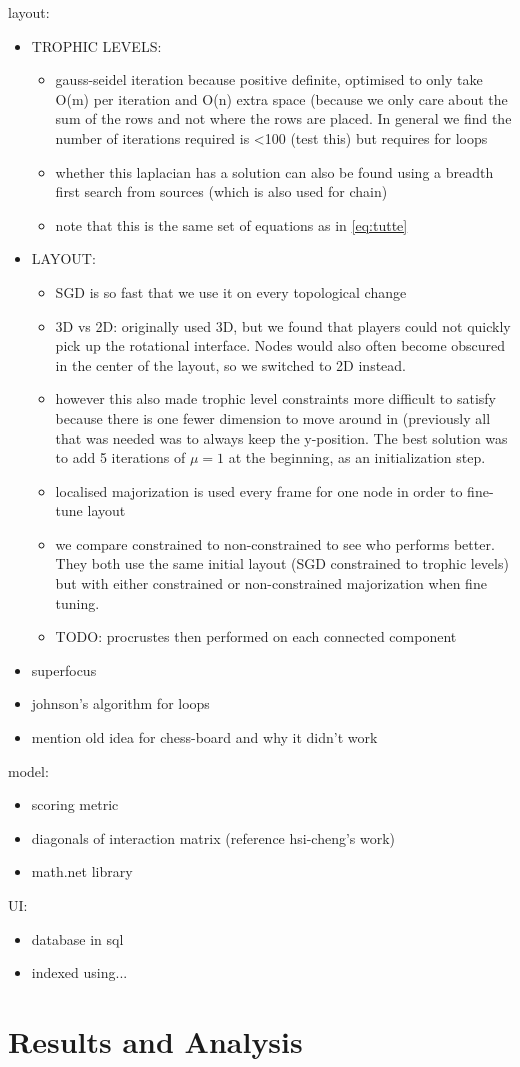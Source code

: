 layout:
\begin{itemize}
    \item TROPHIC LEVELS:
    \begin{itemize}
        \item gauss-seidel iteration because positive definite, optimised to only take O(m) per iteration and O(n) extra space (because we only care about the sum of the rows and not where the rows are placed. In general we find the number of iterations required is <100 (test this) but requires for loops~\cite{oliviasimpsonpaper}
        \item whether this laplacian has a solution can also be found using a breadth first search from sources (which is also used for chain)
        \item note that this is the same set of equations as in \eqref{eq:tutte}
    \end{itemize}
    \item LAYOUT:
    \begin{itemize}
        \item SGD is so fast that we use it on every topological change
        \item 3D vs 2D: originally used 3D, but we found that players could not quickly pick up the rotational interface. Nodes would also often become obscured in the center of the layout, so we switched to 2D instead. 
        \item however this also made trophic level constraints more difficult to satisfy because there is one fewer dimension to move around in (previously all that was needed was to always keep the y-position. The best solution was to add 5 iterations of $\mu=1$ at the beginning, as an initialization step.
        \item localised majorization is used every frame for one node in order to fine-tune layout
        \item we compare constrained to non-constrained to see who performs better. They both use the same initial layout (SGD constrained to trophic levels) but with either constrained or non-constrained majorization when fine tuning.
        \item TODO: procrustes then performed on each connected component
    \end{itemize}
    
    \item superfocus
    \item johnson's algorithm for loops
    \item mention old idea for chess-board and why it didn't work
\end{itemize}

model:
\begin{itemize}
    \item scoring metric
    \item diagonals of interaction matrix (reference hsi-cheng's work)
    \item math.net library
\end{itemize}

UI:
\begin{itemize}
    \item database in sql
    \item indexed using...
\end{itemize}


\section{Results and Analysis}
